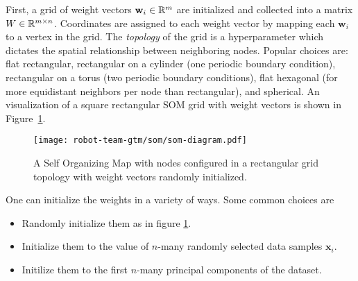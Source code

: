 First, a grid of weight vectors $\mathbf{w}_i\in\mathbb{R}^m$ are initialized and
collected into a matrix $W\in\mathbb{R}^{m\times n}$. Coordinates are assigned to each weight
vector by mapping each $\mathbf{w}_i$ to a vertex in the grid. The
\textit{topology} of the grid is a hyperparameter which dictates the spatial
relationship between neighboring nodes. Popular choices are: flat rectangular,
rectangular on a cylinder (one periodic boundary condition), rectangular on a
torus (two periodic boundary conditions), flat hexagonal (for more
equidistant neighbors per node than rectangular), and spherical. An
visualization of a square rectangular SOM grid with weight vectors is shown in
Figure~\ref{fig:som-diagram}.
\begin{figure}[h]
  \centering
  \texttt{[image: robot-team-gtm/som/som-diagram.pdf]}
  \caption{A Self Organizing Map with nodes configured in a rectangular grid topology with weight vectors randomly initialized.}
  \label{fig:som-diagram}
\end{figure}
One can initialize the weights in a variety of ways. Some common choices are
\begin{itemize}
\item Randomly initialize them as in figure \ref{fig:som-diagram}.
\item Initialize them to the value of $n$-many randomly selected data samples $\mathbf{x}_i$.
\item Initilize them to the first $n$-many principal components of the dataset.
\end{itemize}


